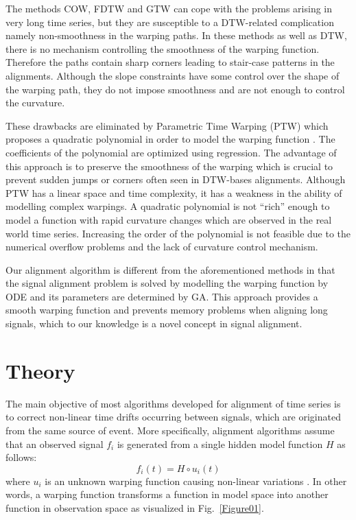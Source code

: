\documentclass[number,1p,12pt]{elsarticle}
\begin{document}
The methods COW, FDTW and GTW can cope with the problems arising in very long time series, but they are susceptible to a DTW-related complication namely non-smoothness in the warping paths. In these methods as well as DTW, there is no mechanism controlling the smoothness of the warping function. Therefore the paths contain sharp corners leading to stair-case patterns in the alignments. Although the slope constraints have some control over the shape of the warping path, they do not impose smoothness and are not enough to control the curvature.

These drawbacks are eliminated by Parametric Time Warping (PTW) which proposes a quadratic polynomial in order to model the warping function \cite{Eilers2004}. The coefficients of the polynomial are optimized using regression. The advantage of this approach is to preserve the smoothness of the warping which is crucial to prevent sudden jumps or corners often seen in DTW-bases alignments. Although PTW has a linear space and time complexity,  it has a weakness in the ability of modelling complex warpings. A quadratic polynomial is not ``rich'' enough to model a function with rapid curvature changes which are observed in the real world time series. Increasing the order of the polynomial is not feasible due to the numerical overflow problems and the lack of curvature control mechanism. 

Our alignment algorithm is different from the aforementioned methods in that the signal alignment problem is solved by modelling the warping function by ODE and its parameters are determined by GA. This approach provides a smooth warping function and prevents memory problems when aligning long signals, which to our knowledge is a novel concept in signal alignment.

\section{Theory}
The main objective of most algorithms developed for alignment of time series is to correct non-linear time drifts occurring between signals, which are originated from the same source of event. More specifically, alignment algorithms assume that an observed signal $f_i$ is generated from a single hidden model function $H$ as follows:
\begin{equation}
 f_i(t)=H \circ u_i (t)
\end{equation}
where $u_i$ is an unknown warping function causing non-linear variations \cite{Ramsay1998a}. In other words, a warping function transforms a function in model space into another function in observation space as visualized in Fig.~\ref{Figure01}. 
\end{document}
